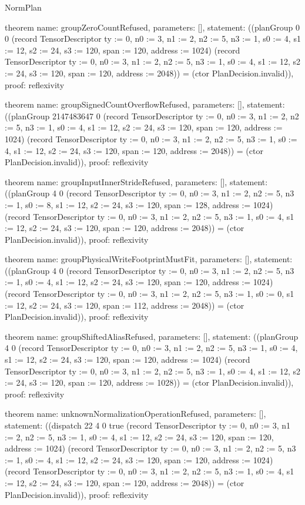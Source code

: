 \begin{lexlean}{NormPlan}
\begin{semanticmodule}
theorem{
  name: groupZeroCountRefused,
  parameters: [],
  statement: ((planGroup 0 0 (record TensorDescriptor {ty := 0, n0 := 3, n1 := 2, n2 := 5, n3 := 1, s0 := 4, s1 := 12, s2 := 24, s3 := 120, span := 120, address := 1024}) (record TensorDescriptor {ty := 0, n0 := 3, n1 := 2, n2 := 5, n3 := 1, s0 := 4, s1 := 12, s2 := 24, s3 := 120, span := 120, address := 2048})) = (ctor PlanDecision.invalid)),
  proof: reflexivity{}
}

theorem{
  name: groupSignedCountOverflowRefused,
  parameters: [],
  statement: ((planGroup 2147483647 0 (record TensorDescriptor {ty := 0, n0 := 3, n1 := 2, n2 := 5, n3 := 1, s0 := 4, s1 := 12, s2 := 24, s3 := 120, span := 120, address := 1024}) (record TensorDescriptor {ty := 0, n0 := 3, n1 := 2, n2 := 5, n3 := 1, s0 := 4, s1 := 12, s2 := 24, s3 := 120, span := 120, address := 2048})) = (ctor PlanDecision.invalid)),
  proof: reflexivity{}
}

theorem{
  name: groupInputInnerStrideRefused,
  parameters: [],
  statement: ((planGroup 4 0 (record TensorDescriptor {ty := 0, n0 := 3, n1 := 2, n2 := 5, n3 := 1, s0 := 8, s1 := 12, s2 := 24, s3 := 120, span := 128, address := 1024}) (record TensorDescriptor {ty := 0, n0 := 3, n1 := 2, n2 := 5, n3 := 1, s0 := 4, s1 := 12, s2 := 24, s3 := 120, span := 120, address := 2048})) = (ctor PlanDecision.invalid)),
  proof: reflexivity{}
}

theorem{
  name: groupPhysicalWriteFootprintMustFit,
  parameters: [],
  statement: ((planGroup 4 0 (record TensorDescriptor {ty := 0, n0 := 3, n1 := 2, n2 := 5, n3 := 1, s0 := 4, s1 := 12, s2 := 24, s3 := 120, span := 120, address := 1024}) (record TensorDescriptor {ty := 0, n0 := 3, n1 := 2, n2 := 5, n3 := 1, s0 := 0, s1 := 12, s2 := 24, s3 := 120, span := 112, address := 2048})) = (ctor PlanDecision.invalid)),
  proof: reflexivity{}
}

theorem{
  name: groupShiftedAliasRefused,
  parameters: [],
  statement: ((planGroup 4 0 (record TensorDescriptor {ty := 0, n0 := 3, n1 := 2, n2 := 5, n3 := 1, s0 := 4, s1 := 12, s2 := 24, s3 := 120, span := 120, address := 1024}) (record TensorDescriptor {ty := 0, n0 := 3, n1 := 2, n2 := 5, n3 := 1, s0 := 4, s1 := 12, s2 := 24, s3 := 120, span := 120, address := 1028})) = (ctor PlanDecision.invalid)),
  proof: reflexivity{}
}

theorem{
  name: unknownNormalizationOperationRefused,
  parameters: [],
  statement: ((dispatch 22 4 0 true (record TensorDescriptor {ty := 0, n0 := 3, n1 := 2, n2 := 5, n3 := 1, s0 := 4, s1 := 12, s2 := 24, s3 := 120, span := 120, address := 1024}) (record TensorDescriptor {ty := 0, n0 := 3, n1 := 2, n2 := 5, n3 := 1, s0 := 4, s1 := 12, s2 := 24, s3 := 120, span := 120, address := 1024}) (record TensorDescriptor {ty := 0, n0 := 3, n1 := 2, n2 := 5, n3 := 1, s0 := 4, s1 := 12, s2 := 24, s3 := 120, span := 120, address := 2048})) = (ctor PlanDecision.invalid)),
  proof: reflexivity{}
}


\end{semanticmodule}
\end{lexlean}
